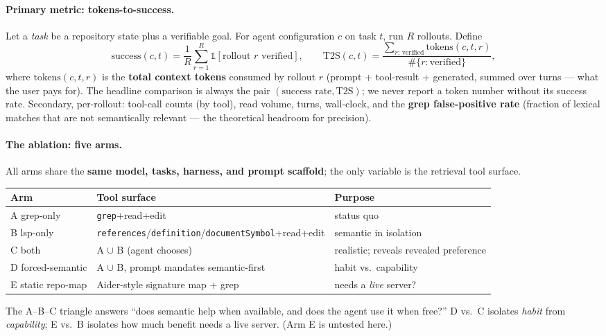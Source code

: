 \documentclass[11pt]{article}
\newcommand{\code}[1]{\texttt{#1}}
\begin{document}
\paragraph{Primary metric: tokens-to-success.} Let a \emph{task} be a repository state plus a
verifiable goal. For agent configuration $c$ on task $t$, run $R$ rollouts. Define
\[
\mathrm{success}(c,t) = \frac{1}{R}\sum_{r=1}^{R} \mathbb{1}[\text{rollout } r \text{ verified}],
\qquad
\mathrm{T2S}(c,t) = \frac{\sum_{r:\,\text{verified}} \mathrm{tokens}(c,t,r)}{\#\{r : \text{verified}\}},
\]
where $\mathrm{tokens}(c,t,r)$ is the \textbf{total context tokens} consumed by rollout $r$ (prompt +
tool-result + generated, summed over turns --- what the user pays for). The headline comparison is
always the pair $(\text{success rate}, \text{T2S})$; we never report a token number without its success
rate. Secondary, per-rollout: tool-call counts (by tool), read volume, turns, wall-clock, and the
\textbf{grep false-positive rate} (fraction of lexical matches that are not semantically relevant ---
the theoretical headroom for precision).

\paragraph{The ablation: five arms.} All arms share the \textbf{same model, tasks, harness, and prompt
scaffold}; the only variable is the retrieval tool surface.

\begin{center}\small
\begin{tabular}{@{}lll@{}}
\toprule
Arm & Tool surface & Purpose \\
\midrule
A grep-only & \code{grep}+read+edit & status quo \\
B lsp-only & \code{references}/\code{definition}/\code{documentSymbol}+read+edit & semantic in isolation \\
C both & A $\cup$ B (agent chooses) & realistic; reveals revealed preference \\
D forced-semantic & A $\cup$ B, prompt mandates semantic-first & habit vs.\ capability \\
E static repo-map & Aider-style signature map + grep & needs a \emph{live} server? \\
\bottomrule
\end{tabular}
\end{center}

The A--B--C triangle answers ``does semantic help when available, and does the agent use it when free?''
D vs.\ C isolates \emph{habit} from \emph{capability}; E vs.\ B isolates how much benefit needs a live
server. (Arm E is untested here.)
\end{document}
